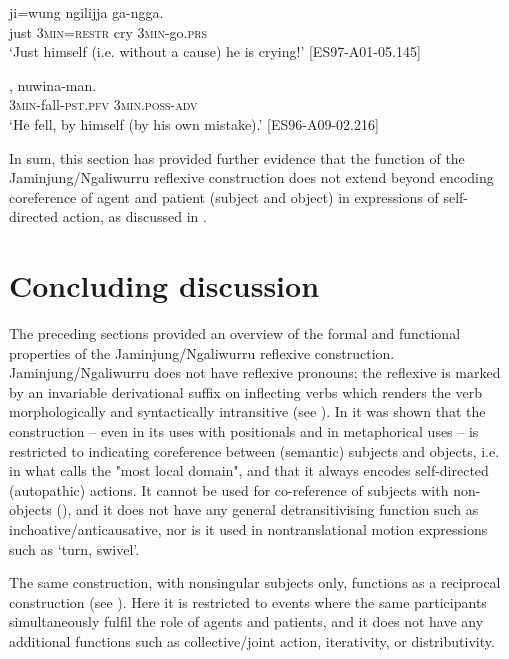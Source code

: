 \documentclass[output=paper,colorlinks,citecolor=brown]{langscibook}
\begin{document}
\ea
{} {ji=wung} {ngilijja} {ga-ngga}. \\
just \textsc{3min=restr} cry \textsc{3min}-go.\textsc{prs} \\
\glt `Just himself (i.e. without a cause) he is crying!' [ES97-A01-05.145]
\label{ex:jiwung}
\z

\ea
{}, {nuwina-man}. \\
\textsc{3min}-fall-\textsc{pst.pfv} \textsc{3min.poss-adv} \\
\glt `He fell, by himself (by his own mistake).' [ES96-A09-02.216]
\label{ex:nuwinaman}
\z

In sum, this section has provided further evidence that the function of the Jaminjung/Ngaliwurru reflexive construction does not extend beyond encoding coreference of agent and patient (subject and object) in expressions of self-directed action, as discussed in .


\section{Concluding discussion} \label{sec:SchultzeBernd:7}

The preceding sections provided an overview of the formal and functional properties of the Jaminjung/Ngaliwurru reflexive construction. Jaminjung/Ngaliwurru does not have reflexive pronouns; the reflexive is marked by an invariable derivational suffix on inflecting verbs which renders the verb morphologically and syntactically intransitive (see ). In  it was shown that the construction – even in its uses with positionals and in metaphorical uses – is restricted to indicating coreference between (semantic) subjects and objects, i.e. in what \citet{Comrie1998} calls the "most local domain", and that it always encodes self-directed (autopathic) actions. It cannot be used for co-reference of subjects with non-objects (), and it does not have any general detransitivising function such as inchoative/anticausative, nor is it used in nontranslational motion expressions such as `turn, swivel'. 

The same construction, with nonsingular subjects only, functions as a reciprocal construction (see ). Here it is restricted to events where the same participants simultaneously fulfil the role of agents and patients, and it does not have any additional functions such as collective/joint action, iterativity, or distributivity. 
\end{document}
